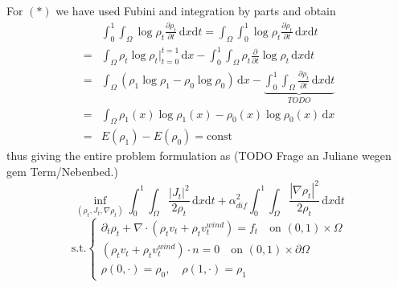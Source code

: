  For $(*)$ we have used Fubini and integration by parts and obtain
 \begin{align*}
	 &\int_0^1\int_\Omega \log\rho_t \frac{\partial\rho_t}{\partial t}\,\mathrm{d}x\mathrm{d}t = \int_\Omega\int_0^1\log\rho_t \frac{\partial\rho_t}{\partial t}\,\mathrm{d}x\mathrm{d}t\\
	 =&\int_\Omega\rho_t\log\rho_t\Big\lvert_{t=0}^{t=1}\,\mathrm{d}x - \int_0^1\int_\Omega \rho_t\frac{\partial}{\partial t}\log\rho_t\,\mathrm{d}x\mathrm{d}t\\
		 =&\int_\Omega\left(\rho_1\log\rho_1 - \rho_0\log\rho_0\right)\,\mathrm{d}x - \underbrace{\int_0^1\int_\Omega  \frac{\partial\rho_t}{\partial t}\,\mathrm{d}x\mathrm{d}t}_{TODO}\\
		 =&\int_\Omega \rho_1(x)\log\rho_1(x) - \rho_0(x) \log\rho_0(x)\, \mathrm{d}x\\
		 =& E(\rho_1) - E(\rho_0) = \mathrm{const}
 \end{align*}
 thus giving the entire problem formulation as (TODO Frage an Juliane wegen gem Term/Nebenbed.)
$$
\inf_{(\rho_t,J_t,\nabla\rho_t)}\int_0^1\int_\Omega \frac{|J_t|^2}{2\rho_t}\,\mathrm{d}x\mathrm{d}t + \alpha_{dif}^2\int_0^1\int_\Omega \frac{|\nabla\rho_t|^2}{2\rho_t}\,\mathrm{d}x\mathrm{d}t
$$
$$
\text{s.t.}\begin{cases}
\partial_t\rho_t + \nabla \cdot (\rho_tv_t + \rho_tv_t^{wind}) = f_t\quad \text{on } (0,1) \times \Omega\\
	(\rho_tv_t + \rho_tv_t^{wind}) \cdot n = 0 \quad \text{on } (0,1) \times \partial\Omega \\
	\rho(0, \cdot) = \rho_0,\quad \rho(1, \cdot) = \rho_1
\end{cases}
$$

